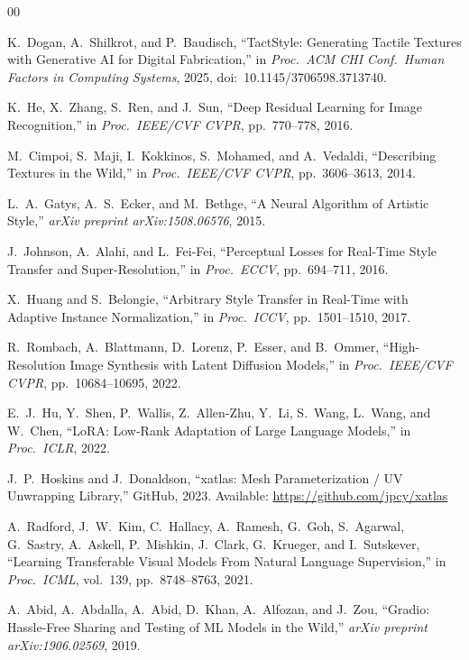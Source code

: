 \documentclass[conference]{IEEEtran}
\begin{document}
\begin{thebibliography}{00}

K.~Dogan, A.~Shilkrot, and P.~Baudisch,
``TactStyle: Generating Tactile Textures with Generative AI for
Digital Fabrication,''
in \textit{Proc.\ ACM CHI Conf.\ Human Factors in Computing Systems},
2025, doi:~10.1145/3706598.3713740.

K.~He, X.~Zhang, S.~Ren, and J.~Sun,
``Deep Residual Learning for Image Recognition,''
in \textit{Proc.\ IEEE/CVF CVPR}, pp.~770--778, 2016.

M.~Cimpoi, S.~Maji, I.~Kokkinos, S.~Mohamed, and A.~Vedaldi,
``Describing Textures in the Wild,''
in \textit{Proc.\ IEEE/CVF CVPR}, pp.~3606--3613, 2014.

L.~A.~Gatys, A.~S.~Ecker, and M.~Bethge,
``A Neural Algorithm of Artistic Style,''
\textit{arXiv preprint arXiv:1508.06576}, 2015.

J.~Johnson, A.~Alahi, and L.~Fei-Fei,
``Perceptual Losses for Real-Time Style Transfer and Super-Resolution,''
in \textit{Proc.\ ECCV}, pp.~694--711, 2016.

X.~Huang and S.~Belongie,
``Arbitrary Style Transfer in Real-Time with Adaptive Instance
Normalization,''
in \textit{Proc.\ ICCV}, pp.~1501--1510, 2017.

R.~Rombach, A.~Blattmann, D.~Lorenz, P.~Esser, and B.~Ommer,
``High-Resolution Image Synthesis with Latent Diffusion Models,''
in \textit{Proc.\ IEEE/CVF CVPR}, pp.~10684--10695, 2022.

E.~J.~Hu, Y.~Shen, P.~Wallis, Z.~Allen-Zhu, Y.~Li, S.~Wang, L.~Wang,
and W.~Chen,
``LoRA: Low-Rank Adaptation of Large Language Models,''
in \textit{Proc.\ ICLR}, 2022.

J.~P.~Hoskins and J.~Donaldson,
``xatlas: Mesh Parameterization / UV Unwrapping Library,''
GitHub, 2023. Available: \url{https://github.com/jpcy/xatlas}

A.~Radford, J.~W.~Kim, C.~Hallacy, A.~Ramesh, G.~Goh, S.~Agarwal,
G.~Sastry, A.~Askell, P.~Mishkin, J.~Clark, G.~Krueger, and I.~Sutskever,
``Learning Transferable Visual Models From Natural Language Supervision,''
in \textit{Proc.\ ICML}, vol.~139, pp.~8748--8763, 2021.

A.~Abid, A.~Abdalla, A.~Abid, D.~Khan, A.~Alfozan, and J.~Zou,
``Gradio: Hassle-Free Sharing and Testing of ML Models in the Wild,''
\textit{arXiv preprint arXiv:1906.02569}, 2019.


\end{thebibliography}
\end{document}
